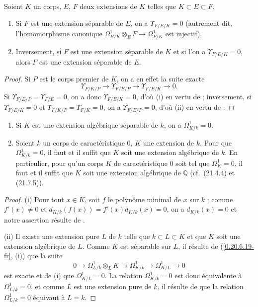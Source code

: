 \begin{corollary}[20.6.19]
\label{0.20.6.19-fr}
Soient $K$ un corps, $E$, $F$ deux extensions de $K$ telles que
$K\subset E\subset F$.
\begin{enumerate}
  \item[\rm(i)] Si $F$ est une extension séparable de $E$, on a
  $\Upsilon_{F/E/K}=0$ (autrement dit, l'homomorphisme canonique
  $\Omega^1_{E/K}\otimes_E F\to\Omega^1_{F/K}$ est injectif).
  \item[\rm(ii)] Inversement, si $F$ est une extension séparable de $K$ et
  si l'on a $\Upsilon_{F/E/K}=0$, alors $F$ est une extension séparable de
  $E$.
\end{enumerate}
\end{corollary}

\begin{proof}
Si $P$ est le corps premier de $K$, on a en effet la suite exacte
\[
  \Upsilon_{F/K/P}\to\Upsilon_{F/E/P}\to\Upsilon_{F/E/K}\to0.
\]
Si $\Upsilon_{F/E/P}=\Upsilon_{F/E}=0$, on a donc
$\Upsilon_{F/E/K}=0$, d'où (i) en vertu de  ;
inversement, si $\Upsilon_{F/E/K}=0$ et
$\Upsilon_{F/K/P}=\Upsilon_{F/K}=0$, on a
$\Upsilon_{F/E/P}=0$, d'où (ii) en vertu de .
\end{proof}

\begin{corollary}[20.6.20]
\label{0.20.6.20-fr}
\begin{enumerate}
  \item[\rm(i)] Si $K$ est une extension algébrique séparable de $k$, on a
  $\Omega^1_{K/k}=0$.
  \item[\rm(ii)] Soient $k$ un corps de caractéristique 0, $K$ une extension
  de $k$. Pour que $\Omega^1_{K/k}=0$, il faut et il suffit que $K$ soit une
  extension algébrique de $k$. En particulier, pour qu'un corps $K$ de
  caractéristique 0 soit tel que $\Omega^1_K=0$, il faut et il suffit que
  $K$ soit une extension algébrique de $\mathbb{Q}$ \textup{(cf.\ (21.4.4) et
  (21.7.5))}.
\end{enumerate}
\end{corollary}

\begin{proof}
(i) Pour tout $x\in K$, soit $f$ le polynôme minimal de $x$ sur $k$ ; comme
$f'(x)\ne0$ et $d_{K/k}(f(x))=f'(x)d_{K/k}(x)=0$, on a
$d_{K/k}(x)=0$ et notre assertion résulte de .

(ii) Il existe une extension pure $L$ de $k$ telle que
$k\subset L\subset K$ et que $K$ soit une extension algébrique de $L$.
Comme $K$ est séparable sur $L$, il résulte de (\ref{0.20.6.19-fr}, (i)) que
la suite 
\[
  0\to\Omega^1_{L/k}\otimes_L K\to\Omega^1_{K/k}
  \to\Omega^1_{K/L}\to0
\]
est exacte et de (i) que $\Omega^1_{K/L}=0$. La relation
$\Omega^1_{K/k}=0$ est donc équivalente à $\Omega^1_{L/k}=0$, et comme
$L$ est une extension pure de $k$, il résulte de  que
la relation $\Omega^1_{L/k}=0$ équivaut à $L=k$.
\end{proof}

